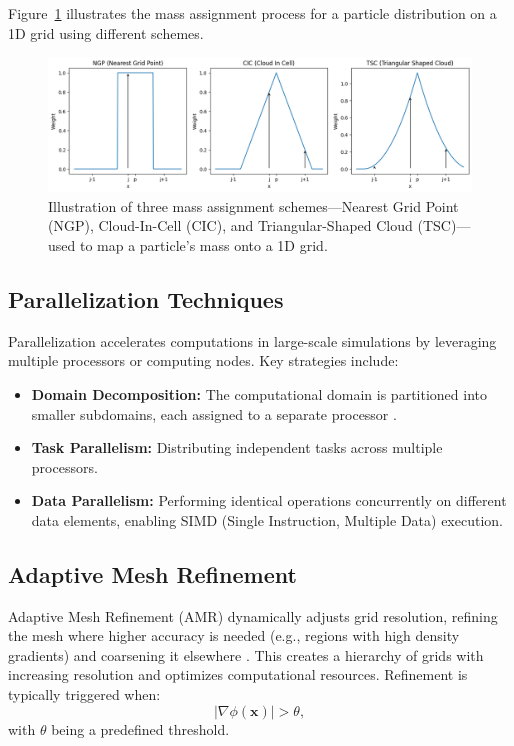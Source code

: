 Figure~\ref{fig:mass-assignment} illustrates the mass assignment process for a particle distribution on a 1D grid using different schemes.
\begin{figure}[ht]
    \centering
    \includegraphics[width=\textwidth]{figures/weight_functions.png}
    \caption{Illustration of three mass assignment schemes—Nearest Grid Point (NGP), Cloud-In-Cell (CIC), and Triangular-Shaped Cloud (TSC)—used to map a particle's mass onto a 1D grid.}
    \label{fig:mass-assignment}
\end{figure}

\subsection{Parallelization Techniques}
Parallelization accelerates computations in large-scale simulations by leveraging multiple processors or computing nodes. Key strategies include:
\begin{itemize}
    \item \textbf{Domain Decomposition:} The computational domain is partitioned into smaller subdomains, each assigned to a separate processor \citep{1986Natur.324..446B}.
    \item \textbf{Task Parallelism:} Distributing independent tasks across multiple processors.
    \item \textbf{Data Parallelism:} Performing identical operations concurrently on different data elements, enabling SIMD (Single Instruction, Multiple Data) execution.
\end{itemize}

\subsection{Adaptive Mesh Refinement}
Adaptive Mesh Refinement (AMR) dynamically adjusts grid resolution, refining the mesh where higher accuracy is needed (e.g., regions with high density gradients) and coarsening it elsewhere \citep{1989JCoPh..82...64B}. This creates a hierarchy of grids with increasing resolution and optimizes computational resources. Refinement is typically triggered when: 
\begin{equation}
    \left| \nabla \phi(\mathbf{x}) \right| > \theta,
\end{equation}
with $\theta$ being a predefined threshold.

